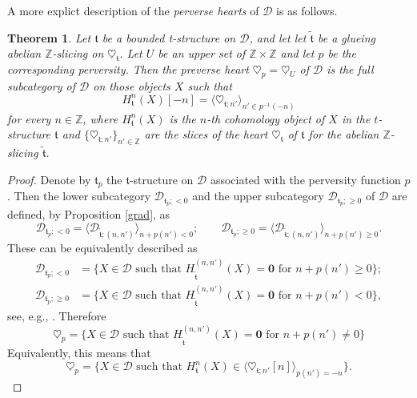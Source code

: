 \documentclass{article}
\newtheorem{thm}{Theorem}[section]
\theoremstyle{definition}
\newcommand{\Z}{\mathbb{Z}}
\newcommand{\tee}{\mathfrak{t}}
\begin{document}
A more explict description of the \emph{perverse hearts} of $\mathscr{D}$ is as follows.
\begin{thm}\label{perverse-heart}
Let $\mathfrak{t}$ be a bounded t-structure on $\mathscr{D}$, and let let $\tilde{\tee}$ be a glueing abelian $\mathbb{Z}$-slicing on $\heartsuit_{\mathfrak{t}}$. Let $U$ be an upper set of $\Z\times \Z$ and let $p$ be the corresponding perversity. Then the preverse heart $\heartsuit_p=\heartsuit_U$ of $\mathscr{D}$ is the full subcategory of $\mathscr{D}$ on those objects $X$ such that 
\[
H_\tee^{n}(X)[-n]= \langle \heartsuit_{\tee;n'}\rangle_{n'\in p^{-1}(-n)}
\]
for every $n\in \Z$, where $H_\tee^{n}(X)$ is the $n$-th cohomology object of $X$ in the $t$-structure $\tee$ and $\{\heartsuit_{\tee;n'}\}_{n'\in \Z}$ are the slices of the heart $\heartsuit_\tee$ of $\tee$ for the abelian $\Z$-slicing $\tilde{\tee}$.
 \end{thm}
 \begin{proof}
 Denote by $\tee_p$ the $\tee$-structure on $\mathscr{D}$ associated with the perversity function $p$. Then the lower subcategory $\mathscr{D}_{\tee_p;<0}$ and the upper subcategory $\mathscr{D}_{\tee_p;\geq 0}$ of $\mathscr{D}$ are defined, by Proposition \ref{grad}, as 
 \[
 \mathscr{D}_{\tee_p;<0}=\langle \mathscr{D}_{\tilde{\tee};(n,n')}\rangle_{n+p(n')<0}; \qquad \mathscr{D}_{\tee_p;\geq 0}=\langle \mathscr{D}_{\tilde{\tee};(n,n')}\rangle_{n+p(n')\geq 0}.
 \]
 These can be equivalently described as
\begin{align*}
 \mathscr{D}_{\tee_p;<0}&=\{X\in \mathscr{D}\text { such that } H_{\tilde{\tee}}^{(n,n')}(X)=\mathbf{0}\text{ for } n+p(n')\geq 0\};\\
   \mathscr{D}_{\tee_p;\geq 0}&=\{X\in \mathscr{D}\text { such that } H_{\tilde{\tee}}^{(n,n')}(X)=\mathbf{0}\text{ for } n+p(n')< 0\},
\end{align*}
 see, e.g., \cite[Remark 4.27]{hearts-and-towers}. Therefore
 \[
 \heartsuit_p=\{X\in \mathscr{D}\text{ such that } H_{\tilde{\tee}}^{(n,n')}(X)=\mathbf{0}\text{ for } n+p(n')\neq 0\}
 \]
 Equivalently, this means that
  \[
 \heartsuit_p=\{X\in \mathscr{D}\text{ such that } H_{\tee}^{n}(X)\in \langle \heartsuit_{\tee;n'}[n]\rangle_{p(n')=-n}\}.
 \]
\end{proof}
\end{document}
